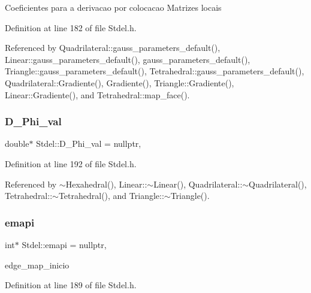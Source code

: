 Coeficientes para a derivacao por colocacao Matrizes locais 

Definition at line 182 of file Stdel.\+h.



Referenced by Quadrilateral\+::gauss\+\_\+parameters\+\_\+default(), Linear\+::gauss\+\_\+parameters\+\_\+default(), gauss\+\_\+parameters\+\_\+default(), Triangle\+::gauss\+\_\+parameters\+\_\+default(), Tetrahedral\+::gauss\+\_\+parameters\+\_\+default(), Quadrilateral\+::\+Gradiente(), Gradiente(), Triangle\+::\+Gradiente(), Linear\+::\+Gradiente(), and Tetrahedral\+::map\+\_\+face().

\mbox{\label{classStdel_a80a6c89c61bfef1160257e97b3ffb0a2}} 
\subsubsection{\texorpdfstring{D\+\_\+\+Phi\+\_\+val}{D\_Phi\_val}}
{\footnotesize\ttfamily double$\ast$ Stdel\+::\+D\+\_\+\+Phi\+\_\+val = nullptr\hspace{0.3cm}{\ttfamily [protected]}, {\ttfamily [inherited]}}



Definition at line 192 of file Stdel.\+h.



Referenced by $\sim$\+Hexahedral(), Linear\+::$\sim$\+Linear(), Quadrilateral\+::$\sim$\+Quadrilateral(), Tetrahedral\+::$\sim$\+Tetrahedral(), and Triangle\+::$\sim$\+Triangle().

\mbox{\label{classStdel_a9ba8eb743aeb36984b7c4ececa837e16}} 
\subsubsection{\texorpdfstring{emapi}{emapi}}
{\footnotesize\ttfamily int$\ast$ Stdel\+::emapi = nullptr\hspace{0.3cm}{\ttfamily [protected]}, {\ttfamily [inherited]}}



edge\+\_\+map\+\_\+inicio 



Definition at line 189 of file Stdel.\+h.



